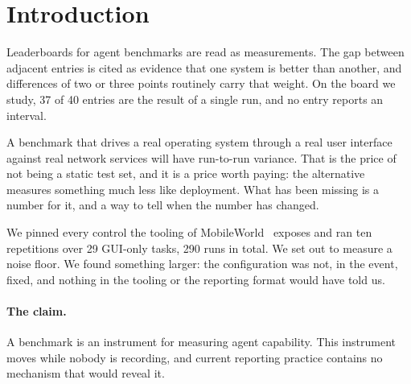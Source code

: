 \section{Introduction}

Leaderboards for agent benchmarks are read as measurements. The gap between
adjacent entries is cited as evidence that one system is better than another,
and differences of two or three points routinely carry that weight. On the
board we study, 37 of 40 entries are the result of a single run, and no entry
reports an interval.

A benchmark that drives a real operating system through a real user interface
against real network services will have run-to-run variance. That is the price
of not being a static test set, and it is a price worth paying: the alternative
measures something much less like deployment. What has been missing is a
number for it, and a way to tell when the number has changed.

We pinned every control the tooling of
MobileWorld~\citep{kong2026mobileworld} exposes and ran ten repetitions over 29
GUI-only tasks, 290 runs in total. We set out to measure a noise floor. We
found something larger: the configuration was not, in the event, fixed, and
nothing in the tooling or the reporting format would have told us.

\paragraph{The claim.} A benchmark is an instrument for measuring agent
capability. This instrument moves while nobody is recording, and current
reporting practice contains no mechanism that would reveal it.

